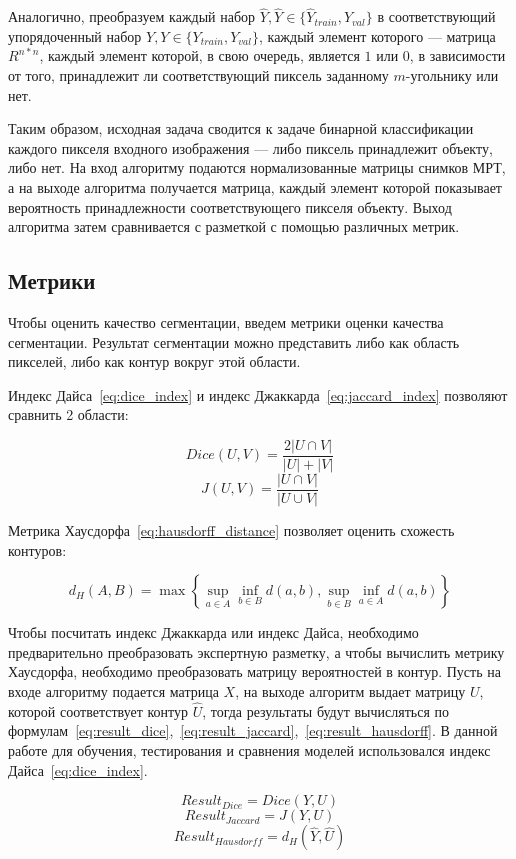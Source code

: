 Аналогично, преобразуем каждый набор $\hat{Y},\hat{Y}\in{}\{\hat{Y}_{train},\hat{Y}_{val}\}$ в соответствующий упорядоченный набор $Y,Y\in{}\{Y_{train},Y_{val}\}$, каждый элемент которого — матрица $R^{n*n}$, каждый элемент которой, в свою очередь, является $1$ или $0$, в зависимости от того, принадлежит ли соответствующий пиксель заданному \mbox{$m$-угольнику} или нет.

Таким образом, исходная задача сводится к задаче бинарной классификации каждого пикселя входного изображения — либо пиксель принадлежит объекту, либо нет. На вход алгоритму подаются нормализованные матрицы снимков МРТ, а на выходе алгоритма получается матрица, каждый элемент которой показывает вероятность принадлежности соответствующего пикселя объекту. Выход алгоритма затем сравнивается с разметкой с помощью различных метрик.

\subsection{Метрики}

Чтобы оценить качество сегментации, введем метрики оценки качества сегментации. Результат сегментации можно представить либо как область пикселей, либо как контур вокруг этой области. 

Индекс Дайса~\eqref{eq:dice_index} и индекс Джаккарда~\eqref{eq:jaccard_index} позволяют сравнить 2 области:

\begin{equation}\label{eq:dice_index}
  Dice(U,V) = \frac{2|U\cap{}V|}{|U| + |V|}
\end{equation}
\begin{equation}\label{eq:jaccard_index}
  J(U,V) = \frac{|U\cap{}V|}{|U\cup{}V|}
\end{equation}

Метрика Хаусдорфа~\eqref{eq:hausdorff_distance} позволяет оценить схожесть контуров:

\begin{equation}\label{eq:hausdorff_distance}
  d_{H}(A,B)=\max\left\{\sup_{a\in{}A}\inf_{b\in{}B}d(a,b),\sup_{b\in{}B}\inf_{a\in{}A}d(a,b)\right\}
\end{equation}

\clearpage
Чтобы посчитать индекс Джаккарда или индекс Дайса, необходимо 
предварительно преобразовать экспертную разметку, а чтобы 
вычислить метрику Хаусдорфа, необходимо преобразовать матрицу 
вероятностей в контур. Пусть на входе алгоритму подается 
матрица $X$, на выходе алгоритм выдает матрицу $U$, которой
соответствует контур $\hat{U}$, тогда результаты будут 
вычисляться по формулам~\eqref{eq:result_dice},~\eqref{eq:result_jaccard},~\eqref{eq:result_hausdorff}. В данной работе для обучения, тестирования и сравнения моделей использовался индекс Дайса~\eqref{eq:dice_index}.

\begin{equation}\label{eq:result_dice}
  Result_{Dice} = Dice(Y, U)
\end{equation}
\begin{equation}\label{eq:result_jaccard}
  Result_{Jaccard} = J(Y, U)
\end{equation}
\begin{equation}\label{eq:result_hausdorff}
  Result_{Hausdorff} = d_{H}(\hat{Y}, \hat{U})
\end{equation}
